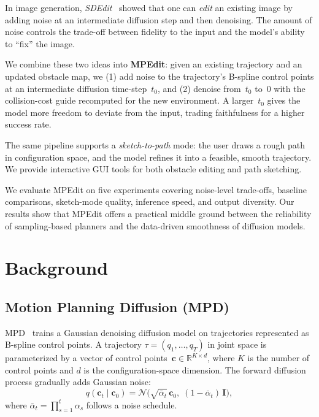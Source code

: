 \documentclass[12pt]{article}
\begin{document}
In image generation, \emph{SDEdit}~\cite{meng2022sdedit} showed that one can
\emph{edit} an existing image by adding noise at an intermediate diffusion
step and then denoising.  The amount of noise controls the trade-off between
fidelity to the input and the model's ability to ``fix'' the image.

We combine these two ideas into \textbf{MPEdit}: given an existing trajectory
and an updated obstacle map, we (1) add noise to the trajectory's B-spline
control points at an intermediate diffusion time-step~$t_0$, and (2) denoise
from~$t_0$ to~$0$ with the collision-cost guide recomputed for the new
environment.  A larger~$t_0$ gives the model more freedom to deviate from the
input, trading faithfulness for a higher success rate.

The same pipeline supports a \emph{sketch-to-path} mode: the user draws a
rough path in configuration space, and the model refines it into a feasible,
smooth trajectory.  We provide interactive GUI tools for both obstacle editing
and path sketching.

We evaluate MPEdit on five experiments covering noise-level trade-offs,
baseline comparisons, sketch-mode quality, inference speed, and output
diversity.  Our results show that MPEdit offers a practical middle ground
between the reliability of sampling-based planners and the data-driven
smoothness of diffusion models.

\section{Background}
\label{sec:background}

\subsection{Motion Planning Diffusion (MPD)}
\label{sec:mpd}

MPD~\cite{carvalho2023mpd} trains a Gaussian denoising diffusion model on
trajectories represented as B-spline control points.  A trajectory
$\tau = (q_1, \dots, q_T)$ in joint space is parameterized by a vector of
control points~$\mathbf{c}\in\mathbb{R}^{K\times d}$, where $K$ is the
number of control points and $d$ is the configuration-space dimension.  The
forward diffusion process gradually adds Gaussian noise:
\begin{equation}
  q(\mathbf{c}_t \mid \mathbf{c}_0)
    = \mathcal{N}\!\bigl(\sqrt{\bar\alpha_t}\,\mathbf{c}_0,\;
      (1-\bar\alpha_t)\,\mathbf{I}\bigr),
  \label{eq:forward}
\end{equation}
where $\bar\alpha_t = \prod_{s=1}^{t}\alpha_s$ follows a noise schedule.
\end{document}
